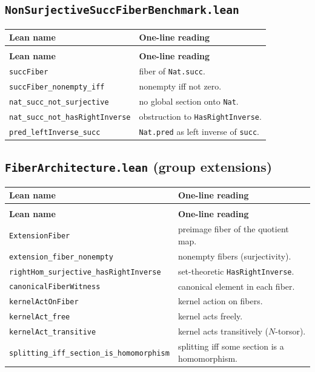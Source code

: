 \documentclass[11pt]{article}
\begin{document}
\subsection*{\texttt{NonSurjectiveSuccFiberBenchmark.lean}}

{\footnotesize
\begin{longtable}{@{}>{\raggedright\arraybackslash}p{}>{\raggedright\arraybackslash}p{}@{}}
\toprule
\textbf{Lean name} & \textbf{One-line reading} \\
\midrule
\endfirsthead
\multicolumn{2}{c}{\textit{(continued)}} \\
\toprule
\textbf{Lean name} & \textbf{One-line reading} \\
\midrule
\endhead
\bottomrule
\endfoot

\texttt{succFiber} & fiber of \texttt{Nat.succ}. \\
\texttt{succFiber\_nonempty\_iff} & nonempty iff not zero. \\
\texttt{nat\_succ\_not\_surjective} & no global section onto \texttt{Nat}. \\
\texttt{nat\_succ\_not\_hasRightInverse} & obstruction to \texttt{HasRightInverse}. \\
\texttt{pred\_leftInverse\_succ} & \texttt{Nat.pred} as left inverse of \texttt{succ}. \\

\end{longtable}
}

\subsection*{\texttt{FiberArchitecture.lean} (group extensions)}

{\footnotesize
\begin{longtable}{@{}>{\raggedright\arraybackslash}p{}>{\raggedright\arraybackslash}p{}@{}}
\toprule
\textbf{Lean name} & \textbf{One-line reading} \\
\midrule
\endfirsthead
\multicolumn{2}{c}{\textit{(continued)}} \\
\toprule
\textbf{Lean name} & \textbf{One-line reading} \\
\midrule
\endhead
\bottomrule
\endfoot

\texttt{ExtensionFiber} & preimage fiber of the quotient map. \\
\texttt{extension\_fiber\_nonempty} & nonempty fibers (surjectivity). \\
\texttt{rightHom\_surjective\_hasRightInverse} & set-theoretic \texttt{HasRightInverse}. \\
\texttt{canonicalFiberWitness} & canonical element in each fiber. \\
\texttt{kernelActOnFiber} & kernel action on fibers. \\
\texttt{kernelAct\_free} & kernel acts freely. \\
\texttt{kernelAct\_transitive} & kernel acts transitively ($N$-torsor). \\
\texttt{splitting\_iff\_section\_is\_homomorphism} & splitting iff some section is a homomorphism. \\

\end{longtable}
}
\end{document}
